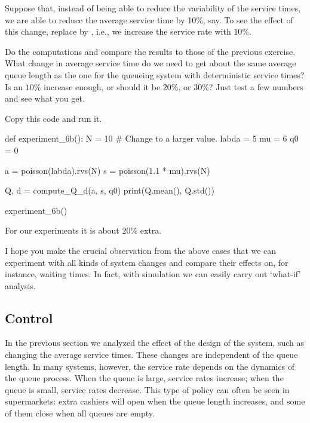 \begin{exercise}
  Suppose that, instead of being able to reduce the variability of the service times, we are able to reduce the average service time by 10\%, say. 
  To see the effect of this change, replace  by , i.e., we increase the service rate with $10\%$.

Do the computations and compare the results to those of the previous exercise. What change in average service time do we need to get about the same average queue length as the one for the queueing system with deterministic service times? Is an $10\%$ increase enough, or should it be $20\%$, or $30\%$? Just test a few numbers and see what you get.
\begin{solution}
Copy this code and run it.

\begin{pyverbatim}
def experiment_6b():
    N = 10 # Change to a larger value.
    labda = 5
    mu = 6
    q0 = 0

    a = poisson(labda).rvs(N)
    s = poisson(1.1 * mu).rvs(N)

    Q, d = compute_Q_d(a, s, q0)
    print(Q.mean(), Q.std())

experiment_6b()
\end{pyverbatim}
For our experiments it is about 20\% extra.
  \end{solution}
\end{exercise}

I hope you make the crucial observation from the above cases that we can experiment with all kinds of system changes and compare their effects on, for instance, waiting times.
In fact, with simulation we can easily carry out `what-if' analysis.

\subsection{Control}
\label{sec:control-}

In the previous section we analyzed the effect of the design of the system, such as changing the average service times.
These changes are independent of the queue length.
In many systems, however, the service rate depends on the dynamics of the queue process.
When the queue is large, service rates increase; when the queue is small, service rates decrease.
This type of policy can often be seen in supermarkets: extra cashiers will open when the queue length increases, and some of them close when all queues are empty.

